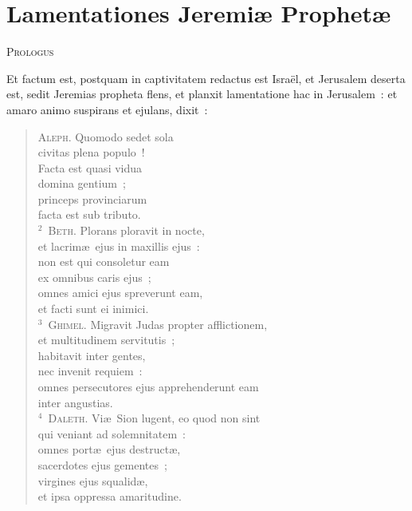 {\centering \section*{Lamentationes Jeremiæ Prophetæ}}\thispagestyle{empty}

\begin{center}\textsc{Prologus}\end{center}\vspace{-6pt} Et factum est, postquam in captivitatem redactus est Isra\"el, et Jerusalem deserta est, sedit Jeremias propheta flens, et planxit lamentatione hac in Jerusalem~: et amaro animo suspirans et ejulans, dixit~: 

\begin{flushleft}\begin{verse}\vspace{-19pt}\textsc{Aleph.} Quomodo sedet sola\\ civitas plena populo~!\\ Facta est quasi vidua\\ domina gentium~;\\ princeps provinciarum\\ facta est sub tributo.\\
${}^{2}$~\textsc{Beth.} Plorans ploravit in nocte,\\ et lacrim\ae\ ejus in maxillis ejus~:\\ non est qui consoletur eam\\ ex omnibus caris ejus~;\\ omnes amici ejus spreverunt eam,\\ et facti sunt ei inimici.\\
${}^{3}$~\textsc{Ghimel.} Migravit Judas propter afflictionem,\\ et multitudinem servitutis~;\\ habitavit inter gentes,\\ nec invenit requiem~:\\ omnes persecutores ejus apprehenderunt eam\\ inter angustias.\\
${}^{4}$~\textsc{Daleth.} Vi\ae\ Sion lugent, eo quod non sint\\ qui veniant ad solemnitatem~:\\ omnes port\ae\ ejus destruct\ae ,\\ sacerdotes ejus gementes~;\\ virgines ejus squalid\ae ,\\ et ipsa oppressa amaritudine.\\

\end{verse}
\end{flushleft}
